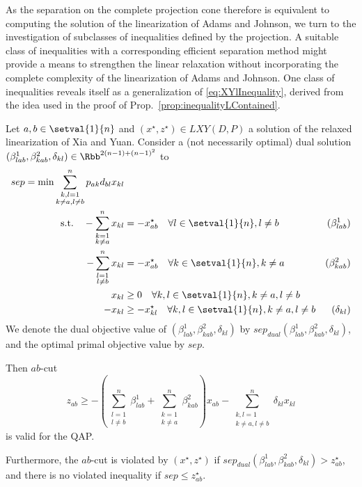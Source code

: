 As the separation on the complete projection cone therefore is equivalent to computing the solution of the linearization of Adams and Johnson, we turn to the investigation of subclasses of inequalities defined by the projection. A suitable class of inequalities with a corresponding efficient separation method might provide a means to strengthen the linear relaxation without incorporating the complete complexity of the linearization of Adams and Johnson. One class of inequalities reveals itself as a generalization of \eqref{eq:XYlInequality}, derived from the idea used in the proof of Prop.~\ref{prop:inequalityLContained}.
\begin{theorem}[$ab$-cuts]
\label{theorem:cuts}
	Let $a,b\in\setval{1}{n}$ and $(x^\star,z^\star)\in LXY(D,P)$ a solution of the relaxed linearization of Xia and Yuan. Consider a (not necessarily optimal) dual solution $(\beta^1_{lab}, \beta^2_{kab}, \delta_{kl})\in\Rbb^{2(n-1)+(n-1)^2}$ to
	\begin{align*}
		sep = \min \sum_{\substack{k,l=1\\k\neq a, l\neq b}}^n p_{ak}d_{bl}x_{kl}&\\
		\text{s.t.}\quad-\sum_{\substack{k=1\\k\neq a}}^nx_{kl}&=-x^\star_{ab}\quad\forall l\in\setval{1}{n}, l\neq b &(\beta^1_{lab})\\
		-\sum_{\substack{l=1\\l\neq b}}^nx_{kl}&=-x^\star_{ab}\quad\forall k\in\setval{1}{n}, k\neq a &(\beta^2_{kab})\\
		x_{kl}&\geq 0\quad\forall k,l\in\setval{1}{n}, k\neq a, l\neq b\\
		-x_{kl}&\geq -x^\star_{kl}\quad\forall k,l\in\setval{1}{n}, k\neq a, l\neq b&(\delta_{kl})
	\end{align*}
	We denote the dual objective value of $(\beta^1_{lab}, \beta^2_{kab}, \delta_{kl})$ by $sep_{dual}(\beta^1_{lab}, \beta^2_{kab}, \delta_{kl})$, and the optimal primal objective value by $sep$.
	
	Then $ab$-cut
	\begin{equation}
		\label{eq:newInequality}
		z_{ab}\geq -\left(\sum_{\substack{l=1\\l\neq b}}^n\beta^1_{lab} + \sum_{\substack{k=1\\k\neq a}}^n\beta^2_{kab}\right)x_{ab} - \sum_{\substack{k,l=1\\k\neq a, l\neq b}}^n \delta_{kl}x_{kl}\tag{$ab$-cut}
	\end{equation}
	is valid for the QAP. 
	
	Furthermore, the $ab$-cut is violated by $(x^\star,z^\star)$ if $sep_{dual}(\beta^1_{lab}, \beta^2_{kab}, \delta_{kl}) > z^\star_{ab}$, and there is no violated inequality if $sep \leq z^\star_{ab}$.
\end{theorem}

